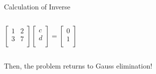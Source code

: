 \documentclass{beamer}
\begin{document}
\begin{frame}{Calculation of Inverse}
\begin{columns}
    \begin{equation*}
        \left[ \begin{matrix}
            1&		2\\
            3&		7\\
        \end{matrix} \right] \left[ \begin{array}{c}
            c\\
            d\\
        \end{array} \right] =\left[ \begin{array}{c}
            0\\
            1\\
        \end{array} \right]
    \end{equation*}
\end{columns}

\vspace{6pt}
Then, the problem returns to Gauss elimination!
\end{frame}
\end{document}
